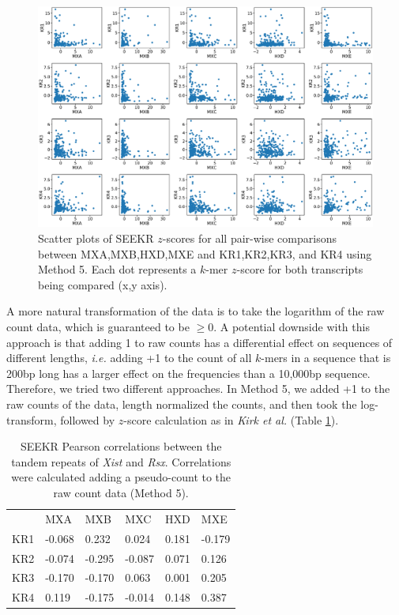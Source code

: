 \begin{figure}[h]
\centering
\includegraphics[width=\textwidth]{images/7_figs.pdf}
\caption[Pseudo-count to raw $k$-mer counts]{Scatter plots of SEEKR $z$-scores for all pair-wise comparisons between MXA,MXB,HXD,MXE and KR1,KR2,KR3, and KR4 using Method 5. Each dot represents a $k$-mer $z$-score for both transcripts being compared (x,y axis).}
\label{fig:7plots}
\end{figure}

A more natural transformation of the data is to take the logarithm of the raw count data, which is guaranteed to be $\geq 0$. A potential downside with this approach is that adding 1 to raw counts has a differential effect on sequences of different lengths, \emph{i.e.} adding +1 to the count of all $k$-mers in a sequence that is 200bp long has a larger effect on the frequencies than a 10,000bp sequence. Therefore, we tried two different approaches. In Method 5, we added +1 to the raw counts of the data, length normalized the counts, and then took the log-transform, followed by $z$-score calculation as in \emph{Kirk et al.} (Table \ref{tbl:kmers5}).

\begin{table}[ht]
\begin{center}
\begin{tabular}{llllll}
&MXA & MXB                  & MXC                  & HXD                  & MXE                                         \\
KR1 & -0.068 & 0.232    & 0.024  & 0.181   & -0.179 \\
KR2 & -0.074 & -0.295 & -0.087 & 0.071  & 0.126  \\
KR3 & -0.170 & -0.170 & 0.063   & 0.001 & 0.205  \\
KR4 & 0.119  & -0.175  & -0.014 & 0.148   & 0.387
\end{tabular}
\caption[Pseudocount to raw $k$-mer counts $z$-score scatter plots]{SEEKR Pearson correlations between the tandem repeats of \emph{Xist} and \emph{Rsx}. Correlations were calculated adding a pseudo-count to the raw count data (Method 5).}
\label{tbl:kmers5}
\end{center}
\end{table}

